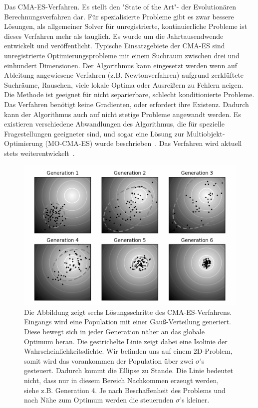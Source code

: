 Das CMA-ES-Verfahren. Es stellt den "State of the Art"- der Evolutionären Berechnungsverfahren dar. Für spezialisierte Probleme gibt es zwar bessere Lösungen, als allgemeiner Solver für unregistrierte, kontinuierliche Probleme ist dieses Verfahren mehr als tauglich. Es wurde um die Jahrtausendwende entwickelt und veröffentlicht. Typische Einsatzgebiete der CMA-ES sind unregistrierte Optimierungsprobleme mit einem Suchraum zwischen drei und einhundert Dimensionen. Der Algorithmus kann eingesetzt werden wenn auf Ableitung angewiesene Verfahren (z.B. Newtonverfahren) aufgrund zerklüftete Suchräume, Rauschen, viele lokale Optima oder Ausreißern zu Fehlern neigen. Die Methode ist geeignet für nicht separierbare, schlecht konditionierte Probleme. Das Verfahren benötigt keine Gradienten, oder erfordert ihre Existenz. Dadurch kann der Algorithmus auch auf nicht stetige Probleme angewandt werden. Es existieren verschiedene Abwandlungen des Algorithmus, die für spezielle Fragestellungen geeigneter sind, und sogar eine Lösung zur Multiobjekt-Optimierung (MO-CMA-ES) wurde beschrieben~\cite{HansenMOO:1}. Das Verfahren wird aktuell stets weiterentwickelt~\cite{hansen2004ecm,hansen2009bbi}.\\
%
\begin{figure} [ht!]
\centering
         \caption[Konzept direkter Optimierung mittels CMA-ES]{Die Abbildung zeigt sechs Lösungsschritte des CMA-ES-Verfahrens. Eingangs wird eine Population mit einer Gauß-Verteilung generiert. Diese bewegt sich in jeder Generation näher an das globale Optimum heran. Die gestrichelte Linie zeigt dabei eine Isolinie der Wahrscheinlichkeitsdichte. Wir befinden uns auf einem 2D-Problem, somit wird das vorankommen der Population über zwei $\sigma$'s gesteuert. Dadurch kommt die Ellipse zu Stande. Die Linie bedeutet nicht, dass nur in diesem Bereich Nachkommen erzeugt werden, siehe z.B. Generation 4. Je nach Beschaffenheit des Problems und nach Nähe zum Optimum werden die steuernden $\sigma$'s kleiner. \cite{Wiki:Images:1}}
         \label{fig:conecpt_cma.es}
         \vspace{0.5cm}
         \includegraphics[width=\textwidth]{img/CMA-ES_algorithm.png}
%      
\end{figure}
%
%

